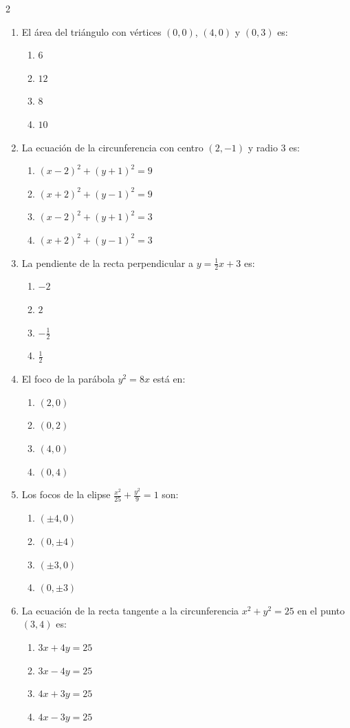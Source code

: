 \documentclass[10pt]{article}
\begin{document}
\begin{multicols}{2}
\begin{enumerate}
\item El área del triángulo con vértices $(0,0)$, $(4,0)$ y $(0,3)$ es:
\begin{enumerate}[label=(\alph*)]
\item $6$
\item $12$
\item $8$
\item $10$
\end{enumerate}

\item La ecuación de la circunferencia con centro $(2,-1)$ y radio $3$ es:
\begin{enumerate}[label=(\alph*)]
\item $(x-2)^2 + (y+1)^2 = 9$
\item $(x+2)^2 + (y-1)^2 = 9$
\item $(x-2)^2 + (y+1)^2 = 3$
\item $(x+2)^2 + (y-1)^2 = 3$
\end{enumerate}

\item La pendiente de la recta perpendicular a $y = \frac{1}{2}x + 3$ es:
\begin{enumerate}[label=(\alph*)]
\item $-2$
\item $2$
\item $-\frac{1}{2}$
\item $\frac{1}{2}$
\end{enumerate}

\item El foco de la parábola $y^2 = 8x$ está en:
\begin{enumerate}[label=(\alph*)]
\item $(2,0)$
\item $(0,2)$
\item $(4,0)$
\item $(0,4)$
\end{enumerate}

\item Los focos de la elipse $\frac{x^2}{25} + \frac{y^2}{9} = 1$ son:
\begin{enumerate}[label=(\alph*)]
\item $(\pm 4,0)$
\item $(0,\pm 4)$
\item $(\pm 3,0)$
\item $(0,\pm 3)$
\end{enumerate}

\item La ecuación de la recta tangente a la circunferencia $x^2+y^2=25$ en el punto $(3,4)$ es:
\begin{enumerate}[label=(\alph*)]
\item $3x+4y=25$
\item $3x-4y=25$
\item $4x+3y=25$
\item $4x-3y=25$
\end{enumerate}


\end{enumerate}
\end{multicols}
\end{document}
